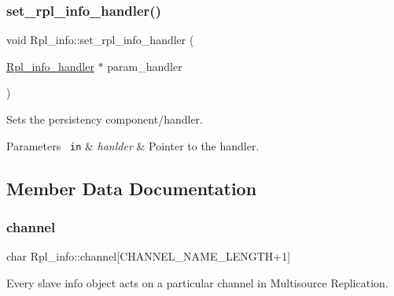 \mbox{\label{classRpl__info_a1c4ec6f3b1db365afee63f16925144f4}} 
\subsubsection{\texorpdfstring{set\+\_\+rpl\+\_\+info\+\_\+handler()}{set\_rpl\_info\_handler()}}
{\footnotesize\ttfamily void Rpl\+\_\+info\+::set\+\_\+rpl\+\_\+info\+\_\+handler (\begin{DoxyParamCaption}\item[{\mbox{\hyperlink{classRpl__info__handler}{Rpl\+\_\+info\+\_\+handler}} $\ast$}]{param\+\_\+handler }\end{DoxyParamCaption})\hspace{0.3cm}{\ttfamily [inline]}}

Sets the persistency component/handler.


\begin{DoxyParams}[1]{Parameters}
\mbox{\texttt{ in}}  & {\em hanlder} & Pointer to the handler. \\
\hline
\end{DoxyParams}


\subsection{Member Data Documentation}
\mbox{\label{classRpl__info_add75a7f8b28db1173a07ae12960b2e7b}} 
\subsubsection{\texorpdfstring{channel}{channel}}
{\footnotesize\ttfamily char Rpl\+\_\+info\+::channel\mbox{[}C\+H\+A\+N\+N\+E\+L\+\_\+\+N\+A\+M\+E\+\_\+\+L\+E\+N\+G\+TH+1\mbox{]}\hspace{0.3cm}{\ttfamily [protected]}}

Every slave info object acts on a particular channel in Multisource Replication. \mbox{\label{classRpl__info_a0ce35fc9ef5b03d26b6cb34dd04b0583}} 
